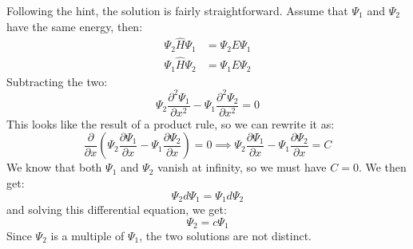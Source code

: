 \begin{sol}
Following the hint, the solution is fairly straightforward. Assume that $\Psi_1$ and $\Psi_2$ have the same energy, then:
\begin{align*}
    \Psi_2\hat{H}\Psi_1 &= \Psi_2 E \Psi_1\\
    \Psi_1\hat{H}\Psi_2 &= \Psi_1 E \Psi_2
\end{align*}
Subtracting the two:
$$\Psi_2 \frac{\partial^2\Psi_1}{\partial x^2}-\Psi_1 \frac{\partial^2\Psi_2}{\partial x^2}=0$$
This looks like the result of a product rule, so we can rewrite it as:
$$\frac{\partial}{\partial x}\left(\Psi_2 \frac{\partial \Psi_1}{\partial x}-\Psi_1 \frac{\partial \Psi_2}{\partial x}\right)=0 \implies \Psi_2 \frac{\partial \Psi_1}{\partial x}-\Psi_1 \frac{\partial \Psi_2}{\partial x} = C$$
We know that both $\Psi_1$ and $\Psi_2$ vanish at infinity, so we must have $C=0$. We then get:
$$\Psi_2 d\Psi_1 = \Psi_1 d\Psi_2$$
and solving this differential equation, we get:
$$\Psi_2 = c\Psi_1$$
Since $\Psi_2$ is a multiple of $\Psi_1$, the two solutions are not distinct.
\end{sol}